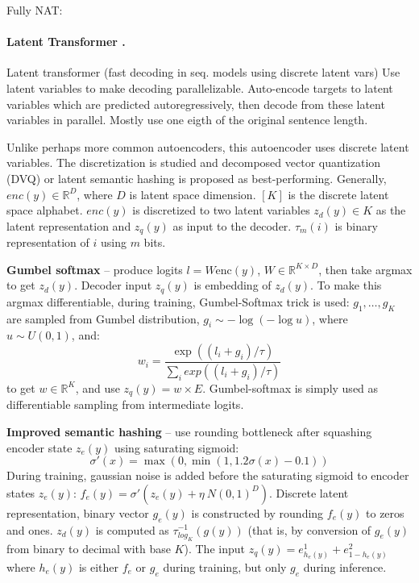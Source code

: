 Fully NAT:



\paragraph{Latent Transformer \citep{kaiser2018fast}.} Latent transformer (fast
decoding in seq. models using discrete latent vars) Use latent variables to make
decoding parallelizable. Auto-encode targets to latent variables which are
predicted autoregressively, then decode from these latent variables in
parallel. Mostly use one eigth of the original sentence length.

Unlike perhaps more common autoencoders, this autoencoder uses discrete latent
variables.  The discretization is studied and decomposed vector quantization
(DVQ) or latent semantic hashing is proposed as best-performing. Generally,
$enc(y) \in \mathbb{R}^D$, where $D$ is latent space dimension. $[K]$ is the
discrete latent space alphabet. $enc(y)$ is discretized to two latent variables
$z_d(y) \in K$ as the latent representation and $z_q(y)$ as input to the
decoder. $\tau_m(i)$ is binary representation of $i$ using $m$ bits.

\textbf{Gumbel softmax} -- produce logits $l = W \text{enc}(y)$,
$W \in \mathbb{R}^{K \times D}$, then take argmax to get $z_d(y)$. Decoder input
$z_q(y)$ is embedding of $z_d(y)$. To make this argmax differentiable, during
training, Gumbel-Softmax trick is used: $g_1, \ldots, g_K$ are sampled from
Gumbel distribution, $g_i \sim -\log(-\log u)$, where $u \sim U(0,1)$, and:
\begin{equation}
  w_i= \frac{\exp((l_i + g_i) / \tau) }{\sum_i exp((l_i + g_i)/\tau)}
\end{equation}
to get $w \in \mathbb{R}^K$, and use $z_q(y) = w \times E$. Gumbel-softmax is
simply used as differentiable sampling from intermediate logits.

\textbf{Improved semantic hashing} -- use rounding bottleneck after squashing
encoder state $z_e(y)$ using saturating sigmoid:
\begin{equation}
  \sigma'(x) = \max(0, \min(1, 1.2 \sigma(x) - 0.1))
\end{equation}
During training, gaussian noise is added before the saturating sigmoid to
encoder states $z_e(y)$: $f_e(y) = \sigma'(z_e(y) + \eta ~ N(0,1)^D)$. Discrete
latent representation, binary vector $g_e(y)$ is constructed by rounding
$f_e(y)$ to zeros and ones. $z_d(y)$ is computed as $\tau^{-1}_{log_K}(g(y))$
(that is, by conversion of $g_e(y)$ from binary to decimal with base $K$). The
input $z_q(y) = e^1_{h_e(y)} + e^2_{1-h_e(y)}$ where $h_e(y)$ is either $f_e$ or
$g_e$ during training, but only $g_e$ during inference.

